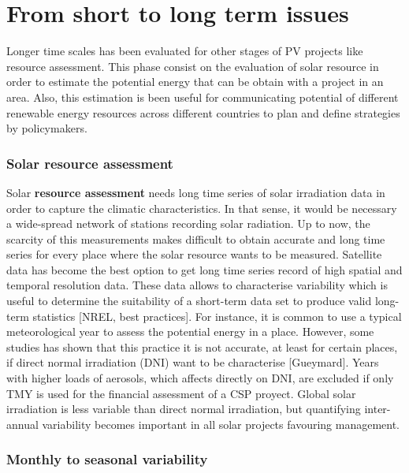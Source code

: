 \section{From short to long term issues}

Longer time scales has been evaluated for other stages of PV projects like resource assessment. This phase consist on the evaluation of solar resource in order to estimate the potential energy that can be obtain with a project in an area. Also, this estimation is been useful for communicating potential of different renewable energy resources across different countries to plan and define strategies by policymakers.

\subsubsection{Solar resource assessment}

Solar \textbf{resource assessment} needs long time series of solar irradiation data in order to capture the climatic characteristics. In that sense, it would be necessary a wide-spread network of stations recording solar radiation. Up to now, the scarcity of this measurements makes difficult to obtain accurate and long time series for every place where the solar resource wants to be measured. Satellite data has become the best option to get long time series record of high spatial and temporal resolution data. These data allows to characterise variability which is useful to determine the suitability of a short-term data set to produce valid long-term statistics [NREL, best practices]. For instance, it is common to use a typical meteorological year to assess the potential energy in a place. However, some studies has shown that this practice it is not accurate, at least for certain places, if direct normal irradiation (DNI) want to be characterise [Gueymard]. Years with higher loads of aerosols, which affects directly on DNI, are excluded if only TMY is used for the financial assessment of a CSP proyect. Global solar irradiation is less variable than direct normal irradiation, but quantifying inter-annual variability becomes important in all solar projects favouring management.


\subsubsection{Monthly to seasonal variability}

